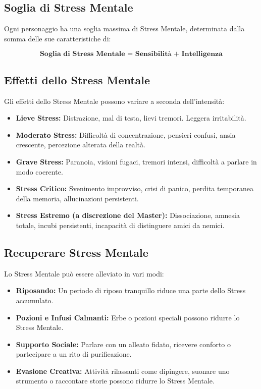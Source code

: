 \documentclass[../manuale_main.tex]{subfiles}
\begin{document}
\subsection*{Soglia di Stress Mentale}
Ogni personaggio ha una soglia massima di Stress Mentale, determinata dalla somma delle sue caratteristiche di:

\[
\textbf{Soglia di Stress Mentale = Sensibilità + Intelligenza}
\]

\subsection*{Effetti dello Stress Mentale}
Gli effetti dello Stress Mentale possono variare a seconda dell'intensità:

\begin{itemize}
\item \textbf{Lieve Stress:} Distrazione, mal di testa, lievi tremori. Leggera irritabilità.
\item \textbf{Moderato Stress:} Difficoltà di concentrazione, pensieri confusi, ansia crescente, percezione alterata della realtà.
\item \textbf{Grave Stress:} Paranoia, visioni fugaci, tremori intensi, difficoltà a parlare in modo coerente.
\item \textbf{Stress Critico:} Svenimento improvviso, crisi di panico, perdita temporanea della memoria, allucinazioni persistenti.
\item \textbf{Stress Estremo (a discrezione del Master):} Dissociazione, amnesia totale, incubi persistenti, incapacità di distinguere amici da nemici.
\end{itemize}

\subsection*{Recuperare Stress Mentale}
Lo Stress Mentale può essere alleviato in vari modi:
\begin{itemize}
    \item \textbf{Riposando:} Un periodo di riposo tranquillo riduce una parte dello Stress accumulato.
    \item \textbf{Pozioni e Infusi Calmanti:} Erbe o pozioni speciali possono ridurre lo Stress Mentale.
    \item \textbf{Supporto Sociale:} Parlare con un alleato fidato, ricevere conforto o partecipare a un rito di purificazione.
    \item \textbf{Evasione Creativa:} Attività rilassanti come dipingere, suonare uno strumento o raccontare storie possono ridurre lo Stress Mentale.
\end{itemize}
\end{document}
